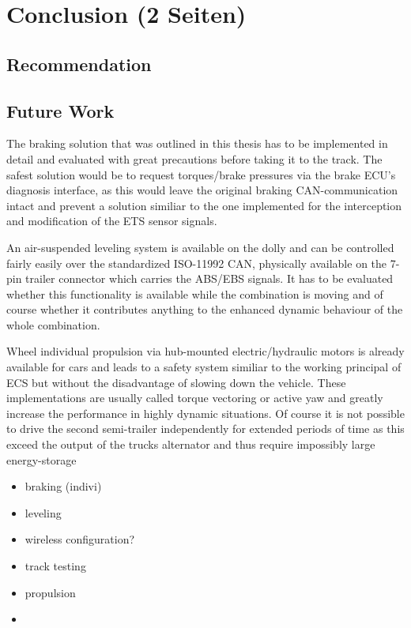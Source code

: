 \documentclass[ExampleMasters.tex]{subfiles}
\begin{document}
\clearpage
\chapter{Conclusion (2 Seiten)}
\label{chap:conclusion}

\section{Recommendation}
\label{sec:recommendation}



\section{Future Work}
\label{sec:future_work}

The braking solution that was outlined in this thesis has to be implemented in detail and evaluated with great  precautions before taking it to the track. The safest solution would be to request torques/brake pressures via the brake ECU's diagnosis interface, as this would leave the original braking CAN-communication intact and prevent a solution similiar to the one implemented for the interception and modification of the ETS sensor signals. 

An air-suspended leveling system is available on the dolly and can be controlled fairly easily over the standardized ISO-11992 CAN, physically available on the 7-pin trailer connector which carries the ABS/EBS signals. It has to be evaluated whether this functionality is available while the combination is moving and of course whether it contributes anything to the enhanced dynamic behaviour of the whole combination.

Wheel individual propulsion via hub-mounted electric/hydraulic motors is already available for cars and leads to a safety system similiar to the working principal of ECS but without the disadvantage of slowing down the vehicle. These implementations are usually called torque vectoring or active yaw and greatly increase the performance in highly dynamic situations. Of course it is not possible to drive the second semi-trailer independently for extended periods of time as this exceed the output of the trucks alternator and thus require impossibly large energy-storage		

\begin{itemize}
	\item braking (indivi)
	\item leveling
	\item wireless configuration?
	\item track testing
	\item propulsion
	\item 
\end{itemize}
\end{document}
